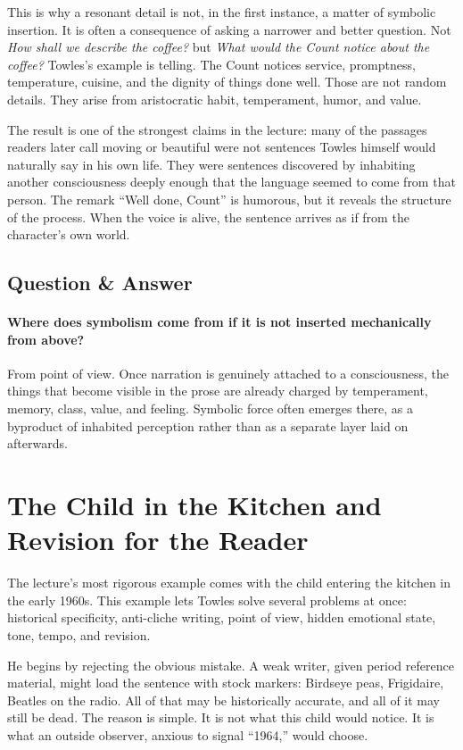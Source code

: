 This is why a resonant detail is not, in the first instance, a matter of symbolic insertion. It is often a consequence of asking a narrower and better question. Not \emph{How shall we describe the coffee?} but \emph{What would the Count notice about the coffee?} Towles's example is telling. The Count notices service, promptness, temperature, cuisine, and the dignity of things done well. Those are not random details. They arise from aristocratic habit, temperament, humor, and value.

The result is one of the strongest claims in the lecture: many of the passages readers later call moving or beautiful were not sentences Towles himself would naturally say in his own life. They were sentences discovered by inhabiting another consciousness deeply enough that the language seemed to come from that person. The remark ``Well done, Count'' is humorous, but it reveals the structure of the process. When the voice is alive, the sentence arrives as if from the character's own world.

\subsection{Question \& Answer}

\paragraph{Where does symbolism come from if it is not inserted mechanically from above?}

From point of view. Once narration is genuinely attached to a consciousness, the things that become visible in the prose are already charged by temperament, memory, class, value, and feeling. Symbolic force often emerges there, as a byproduct of inhabited perception rather than as a separate layer laid on afterwards.

\section{The Child in the Kitchen and Revision for the Reader}

The lecture's most rigorous example comes with the child entering the kitchen in the early 1960s. This example lets Towles solve several problems at once: historical specificity, anti-cliche writing, point of view, hidden emotional state, tone, tempo, and revision.

He begins by rejecting the obvious mistake. A weak writer, given period reference material, might load the sentence with stock markers: Birdseye peas, Frigidaire, Beatles on the radio. All of that may be historically accurate, and all of it may still be dead. The reason is simple. It is not what this child would notice. It is what an outside observer, anxious to signal ``1964,'' would choose.

